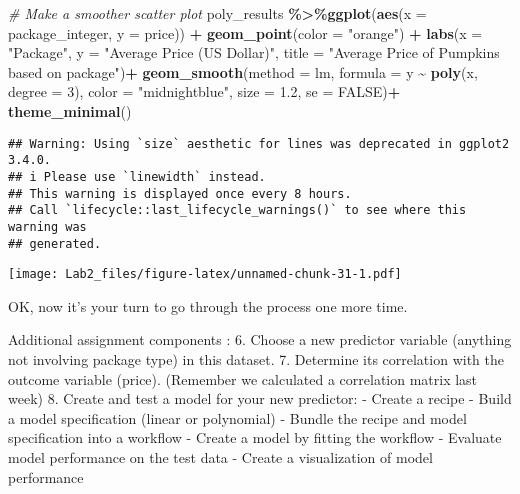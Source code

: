 \documentclass[
]{article}
\newenvironment{Shaded}{\begin{snugshade}}{\end{snugshade}}
\newcommand{\AttributeTok}[1]{\textcolor[rgb]{0.13,0.29,0.53}{#1}}
\newcommand{\CommentTok}[1]{\textcolor[rgb]{0.56,0.35,0.01}{\textit{#1}}}
\newcommand{\ConstantTok}[1]{\textcolor[rgb]{0.56,0.35,0.01}{#1}}
\newcommand{\DecValTok}[1]{\textcolor[rgb]{0.00,0.00,0.81}{#1}}
\newcommand{\FloatTok}[1]{\textcolor[rgb]{0.00,0.00,0.81}{#1}}
\newcommand{\FunctionTok}[1]{\textcolor[rgb]{0.13,0.29,0.53}{\textbf{#1}}}
\newcommand{\NormalTok}[1]{#1}
\newcommand{\SpecialCharTok}[1]{\textcolor[rgb]{0.81,0.36,0.00}{\textbf{#1}}}
\newcommand{\StringTok}[1]{\textcolor[rgb]{0.31,0.60,0.02}{#1}}
\begin{document}
\begin{Shaded}
\begin{Highlighting}[]
\CommentTok{\# Make a smoother scatter plot }
\NormalTok{poly\_results }\SpecialCharTok{\%\textgreater{}\%}\FunctionTok{ggplot}\NormalTok{(}\FunctionTok{aes}\NormalTok{(}\AttributeTok{x =}\NormalTok{ package\_integer, }\AttributeTok{y =}\NormalTok{ price)) }\SpecialCharTok{+}
  \FunctionTok{geom\_point}\NormalTok{(}\AttributeTok{color =} \StringTok{"orange"}\NormalTok{) }\SpecialCharTok{+}
  \FunctionTok{labs}\NormalTok{(}\AttributeTok{x =} \StringTok{"Package"}\NormalTok{, }\AttributeTok{y =} \StringTok{"Average Price (US Dollar)"}\NormalTok{, }\AttributeTok{title =} \StringTok{"Average Price of Pumpkins based on package"}\NormalTok{)}\SpecialCharTok{+}
  \FunctionTok{geom\_smooth}\NormalTok{(}\AttributeTok{method =}\NormalTok{ lm, }\AttributeTok{formula =}\NormalTok{ y }\SpecialCharTok{\textasciitilde{}} \FunctionTok{poly}\NormalTok{(x, }\AttributeTok{degree =} \DecValTok{3}\NormalTok{), }\AttributeTok{color =} \StringTok{"midnightblue"}\NormalTok{, }\AttributeTok{size =} \FloatTok{1.2}\NormalTok{, }\AttributeTok{se =} \ConstantTok{FALSE}\NormalTok{)}\SpecialCharTok{+}
  \FunctionTok{theme\_minimal}\NormalTok{()}
\end{Highlighting}
\end{Shaded}

\begin{verbatim}
## Warning: Using `size` aesthetic for lines was deprecated in ggplot2 3.4.0.
## i Please use `linewidth` instead.
## This warning is displayed once every 8 hours.
## Call `lifecycle::last_lifecycle_warnings()` to see where this warning was
## generated.
\end{verbatim}

\texttt{[image: Lab2\_files/figure-latex/unnamed-chunk-31-1.pdf]}

OK, now it's your turn to go through the process one more time.

Additional assignment components : 6. Choose a new predictor variable
(anything not involving package type) in this dataset. 7. Determine its
correlation with the outcome variable (price). (Remember we calculated a
correlation matrix last week) 8. Create and test a model for your new
predictor: - Create a recipe - Build a model specification (linear or
polynomial) - Bundle the recipe and model specification into a workflow
- Create a model by fitting the workflow - Evaluate model performance on
the test data - Create a visualization of model performance
\end{document}
